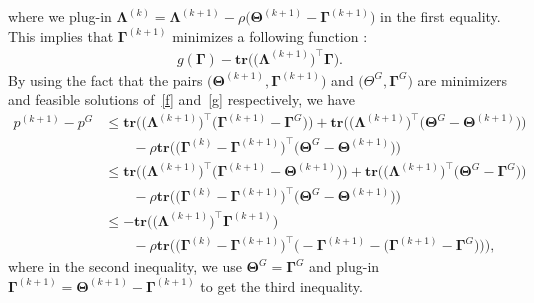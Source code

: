\documentclass[12pt]{article}
\begin{document}
where we plug-in $\boldsymbol{\Lambda}^{(k)}=\boldsymbol{\Lambda}^{(k+1)}-\rho\big( \boldsymbol{\Theta}^{(k+1)} - \boldsymbol{\Gamma}^{(k+1)} \big)$ in the first equality.
This implies that $\boldsymbol{\Gamma}^{(k+1)}$ minimizes a following function :
\begin{align} \label{g}
    g(\boldsymbol{\Gamma}) - \textbf{tr} \big( \big( \boldsymbol{\Lambda}^{(k+1)}\big)^{\top} \boldsymbol{\Gamma} \big).
\end{align}
By using the fact that the pairs $\big( \boldsymbol{\Theta}^{(k+1)}, \boldsymbol{\Gamma}^{(k+1)} \big)$ and $\big( \Theta^{G}, \boldsymbol{\Gamma}^{G} \big)$ are minimizers and feasible solutions of~\eqref{f} and~\eqref{g} respectively, we have
\begin{align}
    p^{(k+1)}-p^{G}
    &\leq \textbf{tr} \big( \big( \boldsymbol{\Lambda}^{(k+1)}\big)^{\top} \big( \boldsymbol{\Gamma}^{(k+1)} - \boldsymbol{\Gamma}^{G} \big) \big) + \textbf{tr} \big( \big( \boldsymbol{\Lambda}^{(k+1)}\big)^{\top} \big( \boldsymbol{\Theta}^{G} - \boldsymbol{\Theta}^{(k+1)}  \big) \big) \nonumber \\
    & \qquad - \rho \textbf{tr} \big( \big( \boldsymbol{\Gamma}^{(k)} - \boldsymbol{\Gamma}^{(k+1)} \big)^{\top} \big( \boldsymbol{\Theta}^{G} - \boldsymbol{\Theta}^{(k+1)} \big) \big) \nonumber \\
    &\leq \textbf{tr} \big( \big( \boldsymbol{\Lambda}^{(k+1)}\big)^{\top} \big( \boldsymbol{\Gamma}^{(k+1)} - \boldsymbol{\Theta}^{(k+1)} \big) \big) + \textbf{tr} \big( \big( \boldsymbol{\Lambda}^{(k+1)}\big)^{\top} \big( \boldsymbol{\Theta}^{G} - \boldsymbol{\Gamma}^{G}  \big) \big) \nonumber \\
    & \qquad - \rho \textbf{tr} \big( \big( \boldsymbol{\Gamma}^{(k)} - \boldsymbol{\Gamma}^{(k+1)} \big)^{\top} \big( \boldsymbol{\Theta}^{G} - \boldsymbol{\Theta}^{(k+1)} \big) \big) \nonumber \\
    &\leq - \textbf{tr} \big( \big( \boldsymbol{\Lambda}^{(k+1)}\big)^{\top} \boldsymbol{\Gamma}^{(k+1)} \big) \nonumber \\
    & \qquad - \rho \textbf{tr} \big( \big( \boldsymbol{\Gamma}^{(k)} - \boldsymbol{\Gamma}^{(k+1)} \big)^{\top} \big( - \boldsymbol{\Gamma}^{(k+1)} - \big( \boldsymbol{\Gamma}^{(k+1)} - \boldsymbol{\Gamma}^{G} \big) \big) \big),  \label{Ineq1}
\end{align}
where in the second inequality, we use $\boldsymbol{\Theta}^{G} = \boldsymbol{\Gamma}^{G}$ and plug-in $\boldsymbol{\Gamma}^{(k+1)}= \boldsymbol{\Theta}^{(k+1)}-\boldsymbol{\Gamma}^{(k+1)}$ to get the third inequality.
\end{document}
